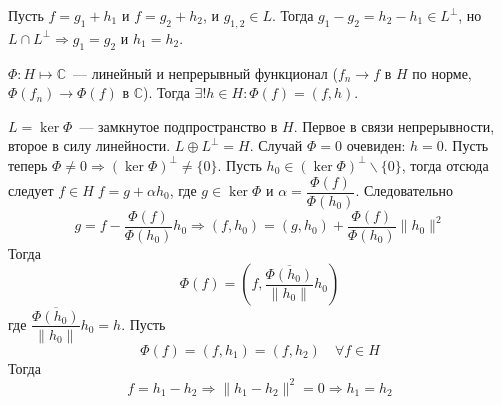 \documentclass[14pt]{extarticle}
\begin{document}
Пусть $f = g_1 + h_1$ и $f = g_2 + h_2$, и $g_{1,2} \in L$.
Тогда $g_1 - g_2 = h_2 - h_1 \in L^\perp$, но $L \cap L^\perp\Rightarrow g_1 = g_2$ и $h_1 = h_2$.

\begin{Theor}
    $\Phi:H \mapsto \mathbb C$~--- линейный и непрерывный функционал ($f_n \to f$ в $H$ по норме, $\Phi(f_n) \to \Phi(f)$ в $\mathbb C$).
    Тогда $\exists! h \in H\colon \Phi(f) = (f,h)$.
\end{Theor}
\begin{Proof}
    $L = \ker \Phi$~--- замкнутое подпространство в $H$.
    Первое в связи непрерывности, второе в силу линейности.
    $L \oplus L^\perp = H$.
    Случай $\Phi = 0$ очевиден: $h = 0$.
    Пусть теперь $\Phi \ne 0\Rightarrow (\ker\Phi)^\perp \ne \{0\}$.
    Пусть $h_0 \in (\ker\Phi)^\perp\backslash\{0\}$, тогда отсюда следует $f \in H\;f = g +\alpha h_0$,
    где $g \in \ker \Phi$ и $\alpha = \dfrac{\Phi(f)}{\Phi(h_0)}$.
    Следовательно
    $$
    g = f - \dfrac{\Phi(f)}{\Phi(h_0)}h_0\Rightarrow (f,h_0) = (g, h_0) + \dfrac{\Phi(f)}{\Phi(h_0)}\|h_0\|^2
    $$
    Тогда
    $$
    \Phi(f) = (f, \dfrac{\overline{\Phi(h_0)}}{\|h_0\|}h_0)
    $$
    где $\dfrac{\overline{\Phi(h_0)}}{\|h_0\|}h_0 = h$.
    Пусть
    $$
    \Phi(f) = (f, h_1) = (f, h_2)\quad\forall f\in H
    $$
    Тогда
    $$
    f = h_1 - h_2\Rightarrow \|h_1 - h_2\|^2 = 0\Rightarrow h_1 = h_2
    $$
\end{Proof}
\end{document}
